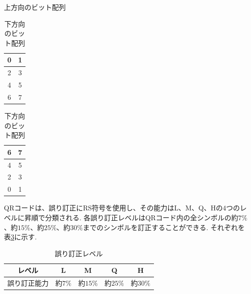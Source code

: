\documentclass{thesis}
\begin{document}
\begin{table}[h]
  \begin{minipage}[t]{.45\textwidth}
    \begin{center}
	\caption{上方向のビット配列 \label{up_bit}}
      \begin{tabular}{|c|c|} \hline
	0&1\\ \hline
	2&3\\ \hline
	4&5\\ \hline
	6&7\\ \hline
      \end{tabular}
    \end{center}
  \end{minipage}
  \hfill
  \begin{minipage}[t]{.55\textwidth}
    \begin{center}
	\caption{下方向のビット配列 \label{down_bit}}
      \begin{tabular}{|c|c|} \hline
	6&7\\ \hline
	4&5\\ \hline
	2&3\\ \hline
	0&1\\ \hline
      \end{tabular}
    \end{center}
  \end{minipage}
\end{table}

QRコードは、誤り訂正にRS符号を使用し、その能力はL、M、Q、Hの$4$つのレベルに昇順で分類される.
各誤り訂正レベルはQRコード内の全シンボルの約$7\%$、約$15\%$、約$25\%$、約$30\%$までのシンボルを訂正することができる.
それぞれを表\ref{Correction_ability}に示す.

\begin{table}[htbp]
\begin{center}
  \caption{誤り訂正レベル \label{Correction_ability}}
    \begin{tabular}{|c|c|c|c|c|} \hline
     レベル&L&M&Q&H\\ \hline\hline
     誤り訂正能力&約$7\%$&約$15\%$&約$25\%$&約$30\%$ \\ \hline
    \end{tabular}{}
\end{center}
\end{table}


\end{document}
